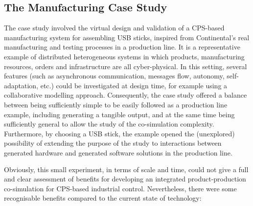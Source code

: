 \subsection{The Manufacturing Case Study} \label{sec:IPP4CPPS}

The case study involved the virtual design and validation of a CPS-based manufacturing system for assembling USB sticks, inspired from Continental's real manufacturing and testing processes in a production line. It is a representative example of distributed heterogeneous systems in which products, manufacturing resources, orders and infrastructure are all cyber-physical. In this setting, several features (such as asynchronous communication, messages flow, autonomy, self-adaptation, etc.) could be investigated at design time, for example using a collaborative modelling approach. Consequently, the case study offered a balance between being sufficiently simple to be easily followed as a production line example, including generating a tangible output, and at the same time being sufficiently general to allow the study of the co-simulation complexity. Furthermore, by choosing a USB stick, the example opened the (unexplored) possibility of extending the purpose of the study to interactions between generated hardware and generated software solutions in the production line.

Obviously, this small experiment, in terms of scale and time, could not give a full and clear assessment of benefits for developing an integrated product-production co-simulation for CPS-based industrial control. Nevertheless, there were some recognisable benefits compared to the current state of technology:

